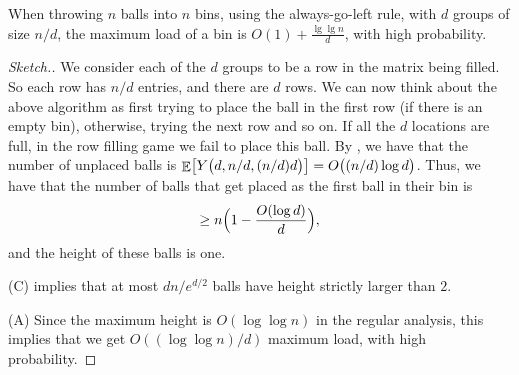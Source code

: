 \begin{theorem}
    When throwing $n$ balls into $n$ bins, using the always-go-left rule,
    with $d$ groups of size $n/d$, the maximum load of a bin is
    $O(1) + \tfrac{\lg \lg n}{d}$, with high probability.
\end{theorem}
\begin{proof}[Sketch.]
    We consider each of the $d$ groups to be a row in the matrix being
    filled. So each row has $n/d$ entries, and there are $d$ rows. We
    can now think about the above algorithm as first trying to place
    the ball in the first row (if there is an empty bin), otherwise,
    trying the next row and so on. If all the $d$ locations are full,
    in the row filling game we fail to place this ball.  By
     , we have that the
    number of unplaced balls is
    $\mathop{\mathbb{E}}\!\left[ {\bigl. Y\bigl(d,n/d, (n/d) d\bigr)} \right] = O\bigl( (n/d) \log d
    \bigr) $.  Thus, we have that the number of balls that get placed
    as the first ball in their bin is
    \begin{equation*}
        \geq n\Bigl(1-\frac{O(\log d)}{d}\Bigr),
    \end{equation*}
    and the height of these balls is one.

     (C) implies that at most {$dn/e^{d/2}$}
    balls have height strictly larger than $2$.

     (A) 
    Since the maximum height is $O( \log \log n)$ in the regular
    analysis, this implies that we get $O( (\log \log n)/d)$ maximum
    load, with high probability.
\end{proof}


